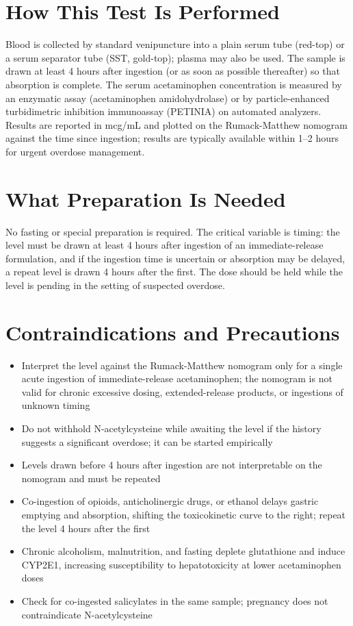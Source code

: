 \section*{How This Test Is Performed}
Blood is collected by standard venipuncture into a plain serum tube (red-top) or a serum separator tube (SST, gold-top); plasma may also be used. The sample is drawn at least 4 hours after ingestion (or as soon as possible thereafter) so that absorption is complete. The serum acetaminophen concentration is measured by an enzymatic assay (acetaminophen amidohydrolase) or by particle-enhanced turbidimetric inhibition immunoassay (PETINIA) on automated analyzers. Results are reported in mcg/mL and plotted on the Rumack-Matthew nomogram against the time since ingestion; results are typically available within 1--2 hours for urgent overdose management.
\section*{What Preparation Is Needed}
No fasting or special preparation is required. The critical variable is timing: the level must be drawn at least 4 hours after ingestion of an immediate-release formulation, and if the ingestion time is uncertain or absorption may be delayed, a repeat level is drawn 4 hours after the first. The dose should be held while the level is pending in the setting of suspected overdose.
\section*{Contraindications and Precautions}
\begin{itemize}
  \item Interpret the level against the Rumack-Matthew nomogram only for a single acute ingestion of immediate-release acetaminophen; the nomogram is not valid for chronic excessive dosing, extended-release products, or ingestions of unknown timing
  \item Do not withhold N-acetylcysteine while awaiting the level if the history suggests a significant overdose; it can be started empirically
  \item Levels drawn before 4 hours after ingestion are not interpretable on the nomogram and must be repeated
  \item Co-ingestion of opioids, anticholinergic drugs, or ethanol delays gastric emptying and absorption, shifting the toxicokinetic curve to the right; repeat the level 4 hours after the first
  \item Chronic alcoholism, malnutrition, and fasting deplete glutathione and induce CYP2E1, increasing susceptibility to hepatotoxicity at lower acetaminophen doses
  \item Check for co-ingested salicylates in the same sample; pregnancy does not contraindicate N-acetylcysteine
\end{itemize}
